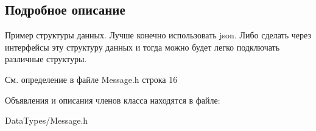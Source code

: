 \subsection{Подробное описание}
Пример структуры данных. Лучше конечно использовать json. Либо сделать через интерфейсы эту структуру данных и тогда можно будет легко подключать различные структуры. 

См. определение в файле Message.\+h строка 16



Объявления и описания членов класса находятся в файле\+:\begin{DoxyCompactItemize}
\item 
Data\+Types/Message.\+h\end{DoxyCompactItemize}
